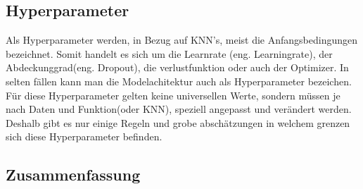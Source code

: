 \subsection{Hyperparameter}
Als Hyperparameter werden, in Bezug auf KNN's, meist die Anfangsbedingungen bezeichnet. Somit handelt es sich um die Learnrate (eng. Learningrate), der Abdeckunggrad(eng. Dropout), die verlustfunktion oder auch der Optimizer. In selten fällen kann man die Modelachitektur auch als Hyperparameter bezeichen. Für diese Hyperparameter gelten keine universellen Werte, sondern müssen je nach Daten und Funktion(oder KNN), speziell angepasst und verändert werden. Deshalb gibt es nur einige Regeln und grobe abschätzungen in welchem grenzen sich diese Hyperparameter befinden. 

\subsection{Zusammenfassung}
